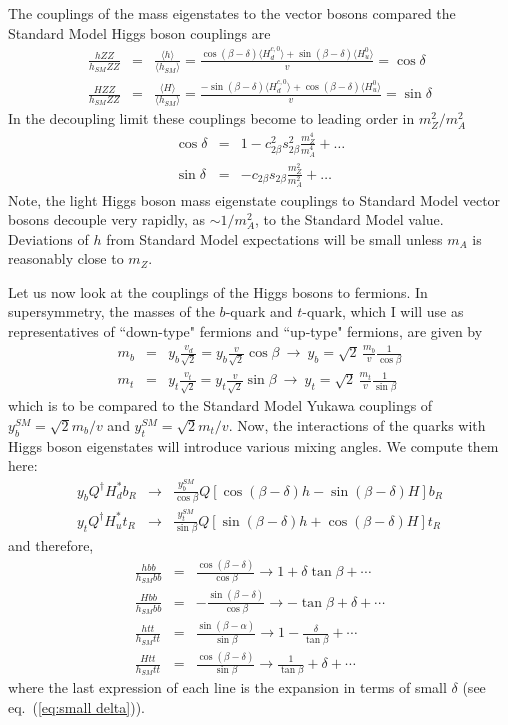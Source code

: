 \documentclass[12pt]{article}
\def\beq{\begin{eqnarray}}
\def\eeq{\end{eqnarray}}
\def\bea{\begin{eqnarray}}
\def\eea{\end{eqnarray}}
\def\eq#1{eq.~(\ref{#1})}
\begin{document}
The couplings of the mass eigenstates to the vector bosons compared the Standard Model Higgs boson couplings are 
\beq
\frac{hZZ}{h_{SM}ZZ}&=& \frac{\langle h\rangle}{\langle h_{SM}\rangle}
= \frac{\cos(\beta-\delta)\langle H^{c,0}_d\rangle+\sin(\beta-\delta) \langle H^0_u\rangle}{v}=
\cos\delta  \\ %
\frac{HZZ}{h_{SM}ZZ}&=&\frac{\langle H\rangle}{\langle h_{SM}\rangle}
=\frac{-\sin(\beta-\delta)\langle H^{c,0}_d\rangle+\cos(\beta-\delta) \langle H^0_u\rangle}{v}=
\sin\delta 
\eeq
In the decoupling limit these couplings become to leading order in $m_Z^2/m_A^2$
\bea
\cos\delta &=& 1-c^2_{2\beta}s^2_{2\beta}\frac{m_Z^4}{m_A^4}+\ldots \\
\sin\delta & =& -c_{2\beta}s_{2\beta}\frac{m_Z^2}{m_A^2}+\ldots
\eea
Note, the light Higgs boson mass eigenstate couplings to Standard Model vector bosons decouple very rapidly, as $\sim 1/m^2_A$, to the Standard Model value. Deviations of $h$ from Standard Model expectations will be small unless $m_A$ is reasonably close to $m_Z$.

Let us now look at the couplings of the Higgs bosons to fermions. In supersymmetry, the masses of the $b$-quark and $t$-quark, which I will use as representatives of ``down-type" fermions and ``up-type" fermions, are given by
\bea
m_b& = &y_b\frac{v_d}{\sqrt{2}}=y_b\frac{v}{\sqrt{2}}\cos\beta ~\longrightarrow~ y_b=\sqrt{2}\, \frac{m_b}{v}\frac{1}{\cos\beta}\\
m_t &=& y_t\frac{v_t}{\sqrt{2}}=y_t\frac{v}{\sqrt{2}}\sin\beta~\longrightarrow~y_t=\sqrt{2}\, \frac{m_t}{v}\frac{1}{\sin\beta}
\eea
which is to be compared to the Standard Model Yukawa couplings of $y_b^{SM}=\sqrt{2}m_b/v$ and $y_t^{SM}=\sqrt{2}m_t/v$. Now, the interactions of the quarks with Higgs boson eigenstates will introduce various mixing angles. We compute them here:
\bea
y_bQ^\dagger H_d^* b_R &\to & \frac{y_b^{SM}}{\cos\beta}Q\left[ \cos(\beta-\delta) h-\sin(\beta-\delta)H\right] b_R \\
y_tQ^\dagger H_u^* t_R &\to & \frac{y_t^{SM}}{\sin\beta}Q\left[ \sin(\beta-\delta)h+\cos(\beta-\delta)H\right] t_R
\eea
and therefore, 
\bea
\frac{hbb}{h_{SM}bb}&=& \frac{\cos(\beta-\delta)}{\cos\beta}\to 1+\delta \tan\beta +\cdots \label{eq:b}\\
\frac{Hbb}{h_{SM}bb}&=&-\frac{\sin(\beta-\delta)}{\cos\beta} \to -\tan\beta+\delta+\cdots\\
\frac{htt}{h_{SM}tt}&=&\frac{\sin(\beta-\alpha)}{\sin\beta} \to 1-\frac{\delta}{\tan\beta}+\cdots \\ 
\frac{Htt}{h_{SM}tt}&=&\frac{\cos(\beta-\delta)}{\sin\beta}\to \frac{1}{\tan\beta}+\delta +\cdots
\eeq
where the last expression of each line is the expansion in terms of small $\delta$ (see \eq{eq:small delta}).
\end{document}
